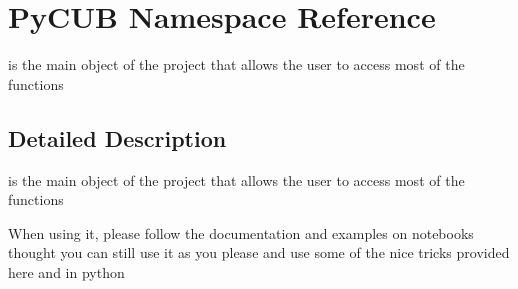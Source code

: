 \hypertarget{namespace_py_c_u_b}{}\section{Py\+C\+UB Namespace Reference}
\label{namespace_py_c_u_b}


is the main object of the project that allows the user to access most of the functions  




\subsection{Detailed Description}
is the main object of the project that allows the user to access most of the functions 

When using it, please follow the documentation and examples on notebooks thought you can still use it as you please and use some of the nice tricks provided here and in python 
